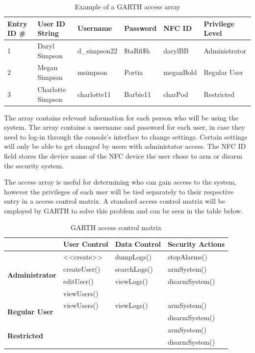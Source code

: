\documentclass{report}
\begin{document}
\begin{table}[h]
    \caption{Example of a GARTH access array}
    \label{access_array}
    \centering
    \begin{tabular}{| l | l | l | l | l | l |}
    \hline
    \textbf{Entry ID \#}&\textbf{User ID String}&\textbf{Username}&
    \textbf{Password}&\textbf{NFC ID}&\textbf{Privilege Level} \\ \hline
    1&Daryl Simpson&d\_simpson22&\$taRfi\$h&darylBB&Administrator \\ \hline
    2&Megan Simpson&msimpson&Portia&meganBold&Regular User \\ \hline
    3&Charlotte Simpson&charlotte11&Barbie11&charPod&Restricted \\
    \hline
    \end{tabular}
\end{table}

The array contains relevant information for each person who will be using the
system. The array contains a username and password for each user, in case
they need to log-in through the console's interface to change settings. Certain
settings will only be able to get changed by users with administator access.
The NFC ID field stores the device name of the NFC device the user chose to arm
or disarm the security system.

The access array is useful for determining who can gain access to the system,
however the privileges of each user will be tied separately to their respective
entry in a access control matrix. A standard access control matrix will be
employed by GARTH to solve this problem and can be seen in the table below.

\begin{table}[h]
    \caption{GARTH access control matrix}
    \label{access_control}
    \centering
    \begin{tabular}{| l | l | l | l |}
    \hline
    &\textbf{User Control}&\textbf{Data Control}&\textbf{Security Actions} \\ \hline
    \multirow{4}{*}{\textbf{Administrator}}&
    \textless\textless create\textgreater\textgreater&dumpLogs()&stopAlarms() \\
    &createUser()&searchLogs()&armSystem() \\ 
    &editUser()&viewLogs()&disarmSystem() \\
    &viewUsers()&& \\ \hline
    \multirow{2}{*}{\textbf{Regular User}}&viewUsers()&viewLogs()&armSystem() \\
    &&&disarmSystem() \\ \hline
    \multirow{2}{*}{\textbf{Restricted}}&&&armSystem() \\
    &&&disarmSystem() \\
    \hline
    \end{tabular}
\end{table}
\end{document}
